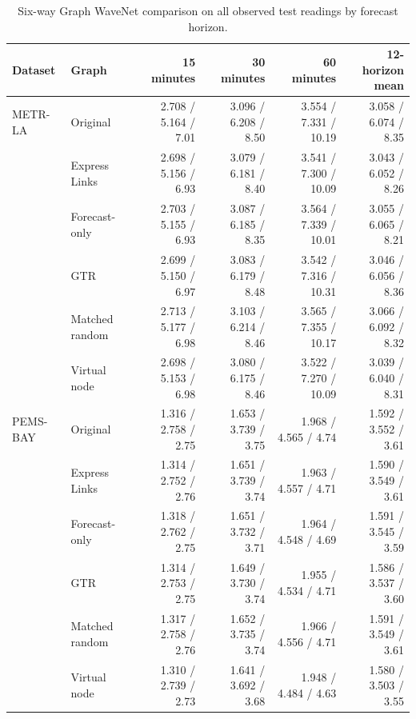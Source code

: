 \begin{table}[H]
\centering
\small
\caption{Six-way Graph WaveNet comparison on all observed test readings by forecast horizon.}
\label{tab:horizons}
\begin{tabular}{@{}llrrrr@{}}
\toprule
Dataset & Graph & 15 minutes & 30 minutes & 60 minutes & 12-horizon mean \\
\midrule
METR-LA & Original & 2.708 / 5.164 / 7.01 & 3.096 / 6.208 / 8.50 & 3.554 / 7.331 / 10.19 & 3.058 / 6.074 / 8.35 \\
 & Express Links & 2.698 / 5.156 / 6.93 & 3.079 / 6.181 / 8.40 & 3.541 / 7.300 / 10.09 & 3.043 / 6.052 / 8.26 \\
 & Forecast-only & 2.703 / 5.155 / 6.93 & 3.087 / 6.185 / 8.35 & 3.564 / 7.339 / 10.01 & 3.055 / 6.065 / 8.21 \\
 & GTR & 2.699 / 5.150 / 6.97 & 3.083 / 6.179 / 8.48 & 3.542 / 7.316 / 10.31 & 3.046 / 6.056 / 8.36 \\
 & Matched random & 2.713 / 5.177 / 6.98 & 3.103 / 6.214 / 8.46 & 3.565 / 7.355 / 10.17 & 3.066 / 6.092 / 8.32 \\
 & Virtual node & 2.698 / 5.153 / 6.98 & 3.080 / 6.175 / 8.46 & 3.522 / 7.270 / 10.09 & 3.039 / 6.040 / 8.31 \\
PEMS-BAY & Original & 1.316 / 2.758 / 2.75 & 1.653 / 3.739 / 3.75 & 1.968 / 4.565 / 4.74 & 1.592 / 3.552 / 3.61 \\
 & Express Links & 1.314 / 2.752 / 2.76 & 1.651 / 3.739 / 3.74 & 1.963 / 4.557 / 4.71 & 1.590 / 3.549 / 3.61 \\
 & Forecast-only & 1.318 / 2.762 / 2.75 & 1.651 / 3.732 / 3.71 & 1.964 / 4.548 / 4.69 & 1.591 / 3.545 / 3.59 \\
 & GTR & 1.314 / 2.753 / 2.75 & 1.649 / 3.730 / 3.74 & 1.955 / 4.534 / 4.71 & 1.586 / 3.537 / 3.60 \\
 & Matched random & 1.317 / 2.758 / 2.76 & 1.652 / 3.735 / 3.74 & 1.966 / 4.556 / 4.71 & 1.591 / 3.549 / 3.61 \\
 & Virtual node & 1.310 / 2.739 / 2.73 & 1.641 / 3.692 / 3.68 & 1.948 / 4.484 / 4.63 & 1.580 / 3.503 / 3.55 \\
\bottomrule
\end{tabular}
\end{table}

